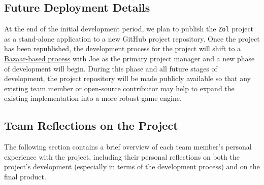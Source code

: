 \documentclass{article}
\newcommand{\projectname}[0] {\texttt{Zol} }
\begin{document}
		\subsection[Deployment]{Future Deployment Details}
		At the end of the initial development period, we plan to publish
		the \projectname project as a stand-alone application to a new
		GitHub project repository.  Once the project has been republished,
		the development process for the project will shift to a 
		\href{http://en.wikipedia.org/wiki/The\_ Cathedral\_ and\_ the\_ Bazaar}
		{Bazaar-based process} with Joe as the primary project manager
		and a new phase of development will begin.  During this phase and all
		future stages of development, the project repository will be made publicly
		available so that any existing team member or open-source contributor
		may help to expand the existing implementation into a more robust
		game engine.

		\subsection[Personal Reflections]{Team Reflections on the Project}
		The following section contains a brief overview of each team member's
		personal experience with the project, including their personal reflections
		on both the project's development (especially in terms of the development
		process) and on the final product.
\end{document}
